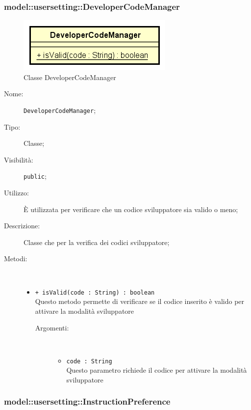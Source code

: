 \documentclass[../DefinizioneDiProdotto.tex]{subfiles}
\begin{document}
\subsubsection{model::usersetting::DeveloperCodeManager}

    \begin{figure}[H]
        \centering
        \includegraphics{img/DeveloperCodeManager.png}
        \caption{Classe DeveloperCodeManager}\label{fig:model::usersetting::DeveloperCodeManager} 
    \end{figure}
    \begin{description}
\item[Nome:] \texttt{DeveloperCodeManager};
\item[Tipo:] Classe;
\item[Visibilità:] \texttt{public};
\item[Utilizzo:] È utilizzata per verificare che un codice sviluppatore sia valido o meno;
\item[Descrizione:] Classe che per la verifica dei codici sviluppatore;
\item[Metodi:] \
\begin{itemize}
\item \texttt{+ isValid(code : String) : boolean}\\
Questo metodo permette di verificare se il codice inserito è valido per attivare la modalità sviluppatore
 \begin{description}
\item[Argomenti:] \
\begin{itemize}
\item \texttt{code : String}\\
Questo parametro richiede il codice per attivare la modalità sviluppatore\end{itemize}
\end{description}
\end{itemize}
\end{description}

\subsubsection{model::usersetting::InstructionPreference}
\end{document}
